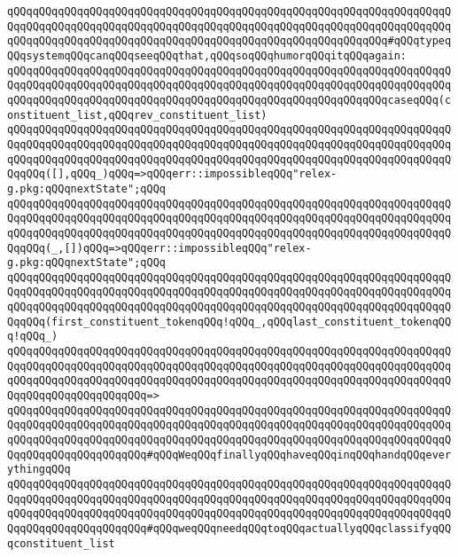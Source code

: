 \verb|qQQqqQQqqQQqqQQqqQQqqQQqqQQqqQQqqQQqqQQqqQQqqQQqqQQqqQQqqQQqqQQqqQQqqQQqqQQqqQQqqQQqqQQqqQQqqQQqqQQqqQQqqQQqqQQqqQQqqQQqqQQqqQQqqQQqqQQqqQQqqQQqqQQqqQQqqQQqqQQqqQQqqQQqqQQqqQQqqQQqqQQqqQQqqQQqqQQqqQQq#qQQqtypeqQQqsystemqQQqcanqQQqseeqQQqthat,qQQqsoqQQqhumorqQQqitqQQqagain:|\newline
\newline
\verb|qQQqqQQqqQQqqQQqqQQqqQQqqQQqqQQqqQQqqQQqqQQqqQQqqQQqqQQqqQQqqQQqqQQqqQQqqQQqqQQqqQQqqQQqqQQqqQQqqQQqqQQqqQQqqQQqqQQqqQQqqQQqqQQqqQQqqQQqqQQqqQQqqQQqqQQqqQQqqQQqqQQqqQQqqQQqqQQqqQQqqQQqqQQqqQQqqQQqqQQqcaseqQQq(constituent_list,qQQqrev_constituent_list)|\newline
\newline
\verb|qQQqqQQqqQQqqQQqqQQqqQQqqQQqqQQqqQQqqQQqqQQqqQQqqQQqqQQqqQQqqQQqqQQqqQQqqQQqqQQqqQQqqQQqqQQqqQQqqQQqqQQqqQQqqQQqqQQqqQQqqQQqqQQqqQQqqQQqqQQqqQQqqQQqqQQqqQQqqQQqqQQqqQQqqQQqqQQqqQQqqQQqqQQqqQQqqQQqqQQqqQQqqQQqqQQqqQQq([],qQQq_)qQQq=>qQQqerr::impossibleqQQq"relex-g.pkg:qQQqnextState";qQQq|\newline
\newline
\verb|qQQqqQQqqQQqqQQqqQQqqQQqqQQqqQQqqQQqqQQqqQQqqQQqqQQqqQQqqQQqqQQqqQQqqQQqqQQqqQQqqQQqqQQqqQQqqQQqqQQqqQQqqQQqqQQqqQQqqQQqqQQqqQQqqQQqqQQqqQQqqQQqqQQqqQQqqQQqqQQqqQQqqQQqqQQqqQQqqQQqqQQqqQQqqQQqqQQqqQQqqQQqqQQqqQQqqQQq(_,[])qQQq=>qQQqerr::impossibleqQQq"relex-g.pkg:qQQqnextState";qQQq|\newline
\newline
\verb|qQQqqQQqqQQqqQQqqQQqqQQqqQQqqQQqqQQqqQQqqQQqqQQqqQQqqQQqqQQqqQQqqQQqqQQqqQQqqQQqqQQqqQQqqQQqqQQqqQQqqQQqqQQqqQQqqQQqqQQqqQQqqQQqqQQqqQQqqQQqqQQqqQQqqQQqqQQqqQQqqQQqqQQqqQQqqQQqqQQqqQQqqQQqqQQqqQQqqQQqqQQqqQQqqQQqqQQq(first_constituent_tokenqQQq!qQQq_,qQQqlast_constituent_tokenqQQq!qQQq_)|\newline
\verb|qQQqqQQqqQQqqQQqqQQqqQQqqQQqqQQqqQQqqQQqqQQqqQQqqQQqqQQqqQQqqQQqqQQqqQQqqQQqqQQqqQQqqQQqqQQqqQQqqQQqqQQqqQQqqQQqqQQqqQQqqQQqqQQqqQQqqQQqqQQqqQQqqQQqqQQqqQQqqQQqqQQqqQQqqQQqqQQqqQQqqQQqqQQqqQQqqQQqqQQqqQQqqQQqqQQqqQQqqQQqqQQqqQQqqQQq=>|\newline
\verb|qQQqqQQqqQQqqQQqqQQqqQQqqQQqqQQqqQQqqQQqqQQqqQQqqQQqqQQqqQQqqQQqqQQqqQQqqQQqqQQqqQQqqQQqqQQqqQQqqQQqqQQqqQQqqQQqqQQqqQQqqQQqqQQqqQQqqQQqqQQqqQQqqQQqqQQqqQQqqQQqqQQqqQQqqQQqqQQqqQQqqQQqqQQqqQQqqQQqqQQqqQQqqQQqqQQqqQQqqQQqqQQqqQQqqQQq#qQQqWeqQQqfinallyqQQqhaveqQQqinqQQqhandqQQqeverythingqQQq|\newline
\verb|qQQqqQQqqQQqqQQqqQQqqQQqqQQqqQQqqQQqqQQqqQQqqQQqqQQqqQQqqQQqqQQqqQQqqQQqqQQqqQQqqQQqqQQqqQQqqQQqqQQqqQQqqQQqqQQqqQQqqQQqqQQqqQQqqQQqqQQqqQQqqQQqqQQqqQQqqQQqqQQqqQQqqQQqqQQqqQQqqQQqqQQqqQQqqQQqqQQqqQQqqQQqqQQqqQQqqQQqqQQqqQQqqQQqqQQq#qQQqweqQQqneedqQQqtoqQQqactuallyqQQqclassifyqQQqconstituent_list|\newline
